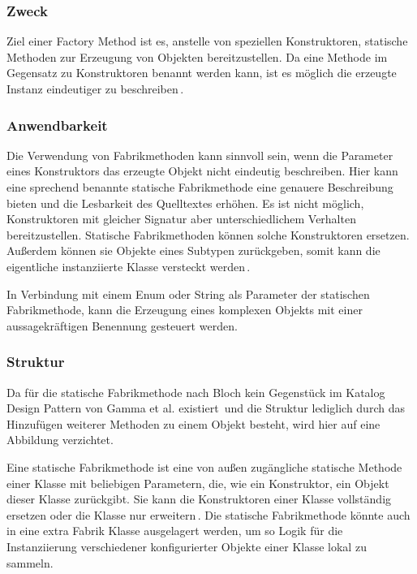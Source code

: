 \documentclass[12pt,oneside,a4paper,parskip]{scrbook}
\begin{document}
\subsubsection{Zweck}

Ziel einer Factory Method ist es, anstelle von speziellen Konstruktoren, statische Methoden zur Erzeugung von Objekten bereitzustellen. Da eine Methode im Gegensatz zu Konstruktoren benannt werden kann, ist es möglich die erzeugte Instanz eindeutiger zu beschreiben\,\cite[S. 5f]{bloch2017}.

\subsubsection{Anwendbarkeit}

Die Verwendung von Fabrikmethoden kann sinnvoll sein, wenn die Parameter eines Konstruktors das erzeugte Objekt nicht eindeutig beschreiben. Hier kann eine sprechend benannte statische Fabrikmethode eine genauere Beschreibung bieten und die Lesbarkeit des Quelltextes erhöhen. Es ist nicht möglich, Konstruktoren mit gleicher Signatur aber unterschiedlichem Verhalten bereitzustellen. Statische Fabrikmethoden können solche Konstruktoren ersetzen. Außerdem können sie Objekte eines Subtypen zurückgeben, somit kann die eigentliche instanziierte Klasse versteckt werden\,\cite[S. 5ff]{bloch2017}.

In Verbindung mit einem Enum oder String als Parameter der statischen Fabrikmethode, kann die Erzeugung eines komplexen Objekts mit einer aussagekräftigen Benennung gesteuert werden.

\subsubsection{Struktur}

Da für die statische Fabrikmethode nach Bloch kein Gegenstück im Katalog Design Pattern von Gamma et al. existiert\,\cite[S. 5]{bloch2017} und die Struktur lediglich durch das Hinzufügen weiterer Methoden zu einem Objekt besteht, wird hier auf eine Abbildung verzichtet.

Eine statische Fabrikmethode ist eine von außen zugängliche statische Methode einer Klasse mit beliebigen Parametern, die, wie ein Konstruktor, ein Objekt dieser Klasse zurückgibt. Sie kann die Konstruktoren einer Klasse vollständig ersetzen oder die Klasse nur erweitern\,\cite[S. 5f]{bloch2017}. Die statische Fabrikmethode könnte auch in eine extra Fabrik Klasse ausgelagert werden, um so Logik für die Instanziierung verschiedener konfigurierter Objekte einer Klasse lokal zu sammeln.
\end{document}
